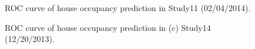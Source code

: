 \begin{figure}[h]
	\caption{
	ROC curve of house occupancy prediction in Study11 (02/04/2014).
}
	\label{fig_rocresults_2}
\end{figure}

\begin{figure}[h]
	\caption{
	ROC curve of house occupancy prediction in (c) Study14 (12/20/2013).
}
	\label{fig_rocresults_3}
\end{figure}




